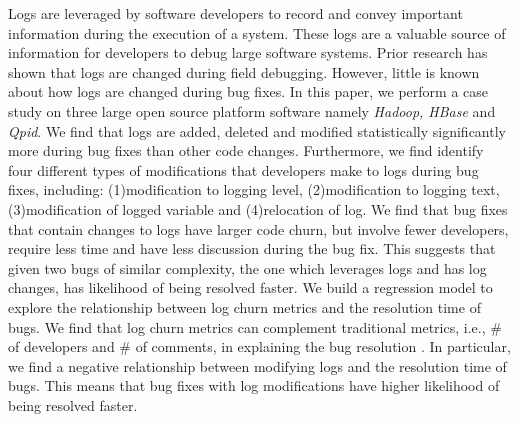 Logs are leveraged by software developers to record and convey important information during the execution of a system. These logs are a valuable source of information for developers to debug large software systems. Prior research has shown that logs are changed during field debugging. However, little is known about how logs are changed during bug fixes. In this paper, we perform a  case study on three large open source platform software namely \emph{ Hadoop, HBase} and \emph{Qpid}. We find that logs are added, deleted and modified statistically significantly more during bug fixes than other code changes. Furthermore, we find identify four different types of modifications that developers make to logs during bug fixes, including: (1)modification to logging level, (2)modification to logging text, (3)modification of logged variable and (4)relocation of log. We find that bug fixes that contain changes to logs have larger code churn, but involve fewer developers, require less time and have less discussion during the bug fix. This suggests that given two bugs of similar complexity, the one which leverages logs and has log changes, has likelihood of being resolved faster.  We build a regression model to explore the relationship between log churn metrics and the resolution time of bugs. We find that log churn metrics can complement traditional metrics, i.e., \# of developers and \# of comments, in explaining the bug resolution . In particular, we find a negative relationship between modifying logs and the resolution time of bugs. This means that bug fixes with log modifications have higher likelihood of being resolved faster.







	
	
	